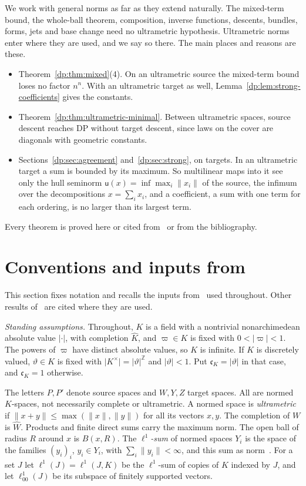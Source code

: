 \documentclass[11pt]{amsart}
\theoremstyle{definition}
\theoremstyle{remark}
\numberwithin{equation}{section}
\newcommand{\Z}{\mathbb Z}
\newcommand{\abs}[1]{\lvert #1\rvert}
\newcommand{\norm}[1]{\lVert #1\rVert}
\newcommand{\Kh}{\widehat K}
\theoremstyle{plain}
\theoremstyle{definition}
\theoremstyle{plain}
\begin{document}
We work with general norms as far as they extend naturally. The mixed-term bound, the whole-ball theorem, composition, inverse functions, descents, bundles, forms, jets and base change need no ultrametric hypothesis. Ultrametric norms enter where they are used, and we say so there. The main places and reasons are these.
\begin{itemize}
\item Theorem~\ref{dp:thm:mixed}(4). On an ultrametric source the mixed-term bound loses no factor $n^n$. With an ultrametric target as well, Lemma~\ref{dp:lem:strong-coefficients} gives the constants.
\item Theorem~\ref{dp:thm:ultrametric-minimal}. Between ultrametric spaces, source descent reaches DP without target descent, since laws on the cover are diagonals with geometric constants.
\item Sections~\ref{dp:sec:agreement} and~\ref{dp:sec:strong}, on targets. In an ultrametric target a sum is bounded by its maximum. So multilinear maps into it see only the hull seminorm $\mathsf u(x)=\inf\max_i\norm{x_i}$ of the source, the infimum over the decompositions $x=\sum_ix_i$, and a coefficient, a sum with one term for each ordering, is no larger than its largest term.
\end{itemize}
Every theorem is proved here or cited from~\cite{I} or from the bibliography.
\section{Conventions and inputs from \texorpdfstring{\cite{I}}{[I]}}\label{dp:sec:conv}

This section fixes notation and recalls the inputs from~\cite{I} used throughout. Other results of~\cite{I} are cited where they are used.

\emph{Standing assumptions.} Throughout, $K$ is a field with a nontrivial nonarchimedean absolute value $\abs\cdot$, with completion $\Kh$, and $\varpi\in K$ is fixed with $0<\abs\varpi<1$. The powers of $\varpi$ have distinct absolute values, so $K$ is infinite. If $K$ is discretely valued, $\vartheta\in K$ is fixed with $\abs{K^\times}=\abs\vartheta^{\Z}$ and $\abs\vartheta<1$. Put $\mathfrak c_K=\abs\vartheta$ in that case, and $\mathfrak c_K=1$ otherwise.

The letters $P,P'$ denote source spaces and $W,Y,Z$ target spaces. All are normed $K$-spaces, not necessarily complete or ultrametric. A normed space is \emph{ultrametric} if $\norm{x+y}\le\max(\norm x,\norm y)$ for all its vectors $x,y$. The completion of $W$ is $\widehat W$. Products and finite direct sums carry the maximum norm. The open ball of radius $R$ around $x$ is $B(x,R)$. The \emph{$\ell^1$-sum} of normed spaces $Y_i$ is the space of the families $(y_i)_i$, $y_i\in Y_i$, with $\sum_i\norm{y_i}<\infty$, and this sum as norm~\cite[Definition~14.15]{I}. For a set $J$ let $\ell^1(J)=\ell^1(J,K)$ be the $\ell^1$-sum of copies of $K$ indexed by $J$, and let $\ell^1_{00}(J)$ be its subspace of finitely supported vectors.
\end{document}

